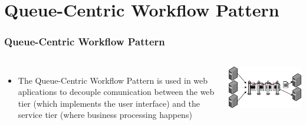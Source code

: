 \documentclass{beamer}
\begin{document}
\section{Queue-Centric Workflow Pattern}
\begin{frame}
\frametitle{Queue-Centric Workflow Pattern}
\begin{columns}
\begin{itemize}
\item The Queue-Centric Workflow Pattern is used in web aplications to decouple comunication between the web tier
(which implements the user interface) and the service tier (where business processing happens)
\end{itemize}
\includegraphics[width=0.75 \textwidth]{sqs.jpg}

\end{columns}
\end{frame}
\end{document}
